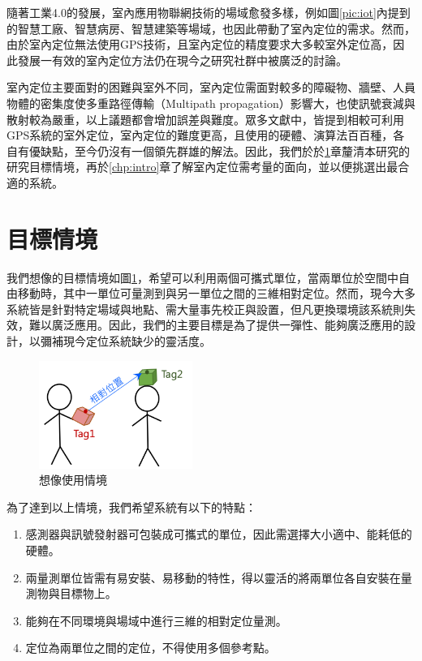隨著工業4.0的發展，室內應用物聯網技術的場域愈發多樣，例如圖\ref{pic:iot}內提到的智慧工廠、智慧病房、智慧建築等場域，也因此帶動了室內定位的需求。然而，由於室內定位無法使用GPS技術，且室內定位的精度要求大多較室外定位高，因此發展一有效的室內定位方法仍在現今之研究社群中被廣泛的討論\cite{survey_indoor2014}。

室內定位主要面對的困難與室外不同，室內定位需面對較多的障礙物、牆壁、人員物體的密集度使多重路徑傳輸（Multipath propagation）影響大，也使訊號衰減與散射較為嚴重，以上議題都會增加誤差與難度。眾多文獻中，\cite{survey_light2020}\cite{survey_light2018}\cite{survey_indoor2014}\cite{survey_indoor2018}\cite{survey:indoor_wayfinding}皆提到相較可利用GPS系統的室外定位，室內定位的難度更高，且使用的硬體、演算法百百種，各自有優缺點，至今仍沒有一個領先群雄的解法。因此，我們於於\ref{chp:motivate}章釐清本研究的研究目標情境，再於\ref{chp:intro}章了解室內定位需考量的面向，並以便挑選出最合適的系統。






\section{目標情境}
\label{chp:motivate}

我們想像的目標情境如圖\ref{pic:imagine}，希望可以利用兩個可攜式單位，當兩單位於空間中自由移動時，其中一單位可量測到與另一單位之間的三維相對定位。然而，現今大多系統皆是針對特定場域與地點、需大量事先校正與設置，但凡更換環境該系統則失效，難以廣泛應用。因此，我們的主要目標是為了提供一彈性、能夠廣泛應用的設計，以彌補現今定位系統缺少的靈活度。

\begin{figure}[ht]
    \centering
    \includegraphics[width=5cm]{ch1pic/imagine.png}
    \caption{想像使用情境}
    \label{pic:imagine}
\end{figure}

為了達到以上情境，我們希望系統有以下的特點：

\begin{enumerate}
    \item 感測器與訊號發射器可包裝成可攜式的單位，因此需選擇大小適中、能耗低的硬體。
    \item 兩量測單位皆需有易安裝、易移動的特性，得以靈活的將兩單位各自安裝在量測物與目標物上。
    \item 能夠在不同環境與場域中進行三維的相對定位量測。
    \item 定位為兩單位之間的定位，不得使用多個參考點。
\end{enumerate}




